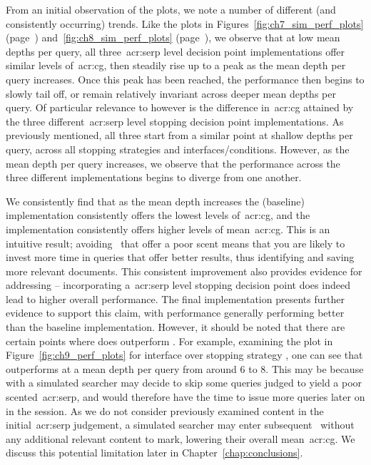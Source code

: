 From an initial observation of the plots, we note a number of different (and consistently occurring) trends. Like the plots in Figures~\ref{fig:ch7_sim_perf_plots} (page~\pageref{fig:ch7_sim_perf_plots}) and~\ref{fig:ch8_sim_perf_plots} (page~\pageref{fig:ch8_sim_perf_plots}), we observe that at low mean depths per query, all three~\gls{acr:serp} level decision point implementations offer similar levels of~\gls{acr:cg}, then steadily rise up to a peak as the mean depth per query increases. Once this peak has been reached, the performance then begins to slowly tail off, or remain relatively invariant across deeper mean depths per query. Of particular relevance to  however is the difference in~\gls{acr:cg} attained by the three different~\gls{acr:serp} level stopping decision point implementations. As previously mentioned, all three start from a similar point at shallow depths per query, across all stopping strategies and interfaces/conditions. However, as the mean depth per query increases, we observe that the performance across the three different implementations begins to diverge from one another.

We consistently find that as the mean depth increases the  (baseline) implementation consistently offers the lowest levels of~\gls{acr:cg}, and the  implementation consistently offers higher levels of mean~\gls{acr:cg}. This is an intuitive result; avoiding~ that offer a poor scent means that you are likely to invest more time in queries that offer better results, thus identifying and saving more relevant documents. This consistent improvement also provides evidence for addressing  -- incorporating a~\gls{acr:serp} level stopping decision point does indeed lead to higher overall performance. The final implementation  presents further evidence to support this claim, with performance generally performing better than the baseline  implementation. However, it should be noted that there are certain points where  does outperform . For example, examining the plot in Figure~\ref{fig:ch9_perf_plots} for interface  over stopping strategy , one can see that  outperforms  at a mean depth per query from around $6$ to $8$. This may be because with a simulated searcher may decide to skip some queries judged to yield a poor scented~\gls{acr:serp}, and would therefore have the time to issue more queries later on in the session. As we do not consider previously examined content in the initial~\gls{acr:serp} judgement, a simulated searcher may enter subsequent~ without any additional relevant content to mark, lowering their overall mean~\gls{acr:cg}. We discuss this potential limitation later in Chapter~\ref{chap:conclusions}.

